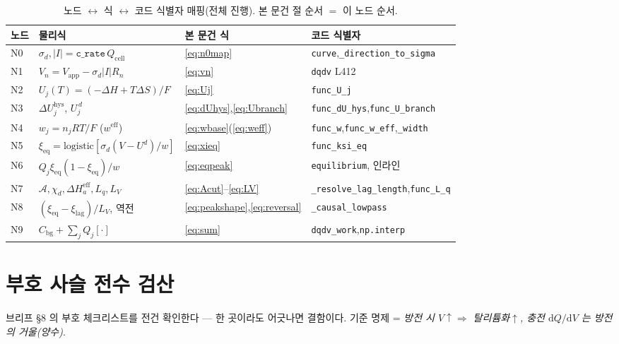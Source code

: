 \documentclass[11pt,a4paper]{article}
\newcommand{\dd}{\mathrm{d}}
\newcommand{\eff}{\mathrm{eff}}
\newcommand{\eq}{\mathrm{eq}}
\newcommand{\app}{\mathrm{app}}
\newcommand{\cell}{\mathrm{cell}}
\newcommand{\bg}{\mathrm{bg}}
\newcommand{\hys}{\mathrm{hys}}
\newcommand{\code}[1]{\texttt{#1}}
\begin{document}
\begin{table}[t]
\centering
\renewcommand{\arraystretch}{1.3}
\caption{노드 $\leftrightarrow$ 식 $\leftrightarrow$ 코드 식별자 매핑(전체 진행). 본 문건 절 순서 $=$ 이 노드 순서.}
\label{tab:nodemap}
\begin{tabular}{l l l l}
\toprule
노드 & 물리식 & 본 문건 식 & 코드 식별자 \\
\midrule
N0 & $\sigma_d,|I|=\code{c\_rate}\,Q_\cell$ & \eqref{eq:n0map} & \code{curve},\code{\_direction\_to\_sigma} \\
N1 & $V_n=V_\app-\sigma_d|I|R_n$ & \eqref{eq:vn} & \code{dqdv} L412 \\
N2 & $U_j(T)=(-\Delta H+T\Delta S)/F$ & \eqref{eq:Uj} & \code{func\_U\_j} \\
N3 & $\Delta U_j^\hys$, $U_j^{\,d}$ & \eqref{eq:dUhys},\eqref{eq:Ubranch} & \code{func\_dU\_hys},\code{func\_U\_branch} \\
N4 & $w_j=n_jRT/F$ ($w^\eff$) & \eqref{eq:wbase}(\eqref{eq:weff}) & \code{func\_w},\code{func\_w\_eff},\code{\_width} \\
N5 & $\xi_\eq=\mathrm{logistic}[\sigma_d(V-U^d)/w]$ & \eqref{eq:xieq} & \code{func\_ksi\_eq} \\
N6 & $Q_j\xi_\eq(1-\xi_\eq)/w$ & \eqref{eq:eqpeak} & \code{equilibrium}, 인라인 \\
N7 & $\mathcal A,\chi_d,\Delta H_a^\eff,L_q,L_V$ & \eqref{eq:Acut}--\eqref{eq:LV} & \code{\_resolve\_lag\_length},\code{func\_L\_q} \\
N8 & $(\xi_\eq-\xi_\mathrm{lag})/L_V$, 역전 & \eqref{eq:peakshape},\eqref{eq:reversal} & \code{\_causal\_lowpass} \\
N9 & $C_\bg+\sum_jQ_j[\cdot]$ & \eqref{eq:sum} & \code{dqdv\_work},\code{np.interp} \\
\bottomrule
\end{tabular}
\end{table}

\section{부호 사슬 전수 검산}\label{sec:signcheck}
브리프 §8 의 부호 체크리스트를 전건 확인한다 — 한 곳이라도 어긋나면 결함이다. 기준 명제 = \emph{방전 시
$V\!\uparrow\Rightarrow$ 탈리튬화$\uparrow$, 충전 $\dd Q/\dd V$ 는 방전의 거울(양수)}.
\end{document}
